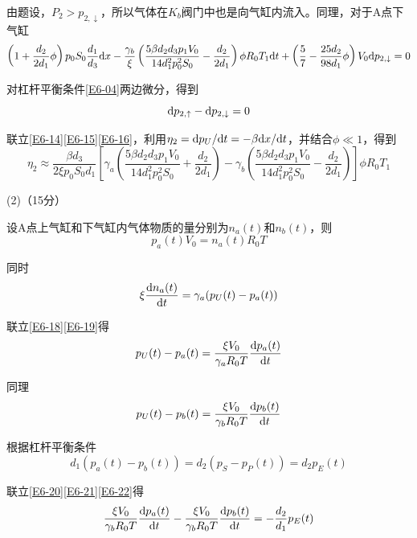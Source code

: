 \documentclass[10pt,a4paper,onecolumn,UTF8]{ctexart}
\begin{document}
	由题设，$P_2>p_{2,\downarrow}$，所以气体在$K_b$阀门中也是向气缸内流入。同理，对于A点下气缸
	\begin{equation}\label{E6-15}
		\left(1+\frac{d_2}{2d_1}\phi\right)p_0S_0\frac{d_1}{d_3}\mathrm{d} x-\frac{\gamma_b}{\xi}\left(\frac{5\beta d_2d_3p_1V_0}{14d_1^2p_0^2S_0}-\frac{d_2}{2d_1}\right)\phi R_0T_1\mathrm{d} t+ \left(\frac 5 7-\frac{25d_2}{98d_1}\phi\right)V_0\mathrm{d} p_{2,\downarrow}=0
	\end{equation}
	
	对杠杆平衡条件\eqref{E6-04}两边微分，得到
	\begin{equation}\label{E6-16}
		\mathrm{d} p_{2,\uparrow}-\mathrm{d} p_{2,\downarrow}=0
	\end{equation}
	
	联立\eqref{E6-14}\eqref{E6-15}\eqref{E6-16}，利用$\eta_2=\mathrm{d} p_U/\mathrm{d} t=-\beta\mathrm{d} x/\mathrm{d} t$，并结合$\phi\ll1$，得到
	\begin{equation}\label{E6-17}
		\eta_2\approx\frac{\beta d_3}{2\xi p_0S_0d_1 }\left[\gamma_a\left(\frac{5\beta d_2d_3p_1V_0}{14d_1^2p_0^2S_0}+\frac{d_2}{2d_1}\right)-\gamma_b\left(\frac{5\beta d_2d_3p_1V_0}{14d_1^2p_0^2S_0}-\frac{d_2}{2d_1}\right)\right]\phi R_0T_1		
	\end{equation}
	
	(2)（15分）
	
	设A点上气缸和下气缸内气体物质的量分别为$n_a(t)$和$n_b(t)$，则
	\begin{equation}\label{E6-18}
		p_a(t)V_0=n_a(t)R_0T
	\end{equation}
	
	同时
	\begin{equation}\label{E6-19}
		\xi\frac{\mathrm{d} n_a(t)}{\mathrm{d} t}=\gamma_a(p_U(t)-p_a(t))
	\end{equation}
	
	联立\eqref{E6-18}\eqref{E6-19}得
	\begin{equation}\label{E6-20}
		p_U(t)-p_a(t)=\frac{\xi V_0}{\gamma_aR_0T}\frac{\mathrm{d} p_a(t)}{\mathrm{d} t}
	\end{equation}
	
	同理
	\begin{equation}\label{E6-21}
		p_U(t)-p_b(t)=\frac{\xi V_0}{\gamma_bR_0T}\frac{\mathrm{d} p_b(t)}{\mathrm{d} t}
	\end{equation}
	
	根据杠杆平衡条件
	\begin{equation}\label{E6-22}
		d_1(p_a(t)-p_b(t))=d_2(p_S-p_P(t))=d_2 p_E(t)
	\end{equation}
	
	联立\eqref{E6-20}\eqref{E6-21}\eqref{E6-22}得
	\begin{equation}\label{E6-23}
		\frac{\xi V_0}{\gamma_bR_0T}\frac{\mathrm{d} p_a(t)}{\mathrm{d} t}-\frac{\xi V_0}{\gamma_bR_0T}\frac{\mathrm{d} p_b(t)}{\mathrm{d} t}=-\frac{d_2}{d_1} p_E(t)
	\end{equation}
	
\end{document}

